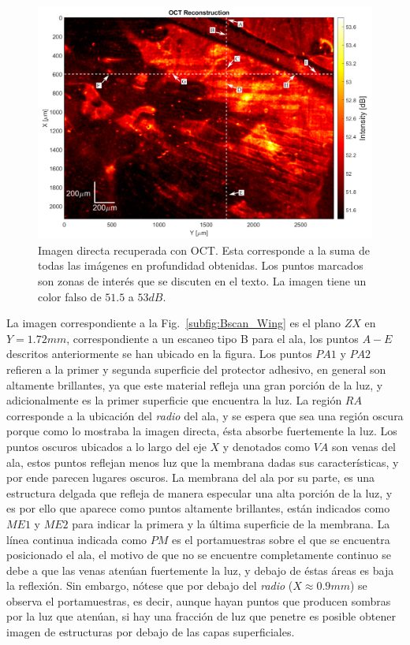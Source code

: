 \begin{figure}[h!]
	\centering
	\includegraphics[width=0.7\linewidth]{img/chap2/OCT_projection_points}
	\caption[Imagen recuperada con OCT del ala de \textit{blattodea}.]{Imagen directa recuperada con OCT. Esta corresponde a la suma de todas las imágenes en profundidad obtenidas. Los puntos marcados son zonas de interés que se discuten en el texto. La imagen tiene un color falso de $51.5$ a $53dB$.}
	\label{fig:OCT_projection_points}
\end{figure}

La imagen correspondiente a la Fig.~\ref{subfig:Bscan_Wing} es el plano $ZX$ en $Y=1.72mm$, correspondiente a un escaneo tipo B para el ala, los puntos $A-E$ descritos anteriormente se han ubicado en la figura. Los puntos $PA1$ y $PA2$ refieren a la primer y segunda superficie del protector adhesivo, en general son altamente brillantes, ya que este material refleja una gran porción de la luz, y adicionalmente es la primer superficie que encuentra la luz. La región $RA$ corresponde a la ubicación del \emph{radio} del ala, y se espera que sea una región oscura porque como lo mostraba la imagen directa, ésta absorbe fuertemente la luz. Los puntos oscuros ubicados a lo largo del eje $X$ y denotados como $VA$ son venas del ala, estos puntos reflejan menos luz que la membrana dadas sus características, y por ende parecen lugares oscuros. La membrana del ala por su parte, es una estructura delgada que refleja de manera especular una alta porción de la luz, y es por ello que aparece como puntos altamente brillantes, están indicados como $ME1$ y $ME2$ para indicar la primera y la última superficie de la membrana. La línea continua indicada como $PM$ es el portamuestras sobre el que se encuentra posicionado el ala, el motivo de que no se encuentre completamente continuo se debe a que las venas atenúan fuertemente la luz, y debajo de éstas áreas es baja la reflexión. Sin embargo, nótese que por debajo del \emph{radio} ($X\approx 0.9mm$) se observa el portamuestras, es decir, aunque hayan puntos que producen sombras por la luz que atenúan, si hay una fracción de luz que penetre es posible obtener imagen de estructuras por debajo de las capas superficiales.

